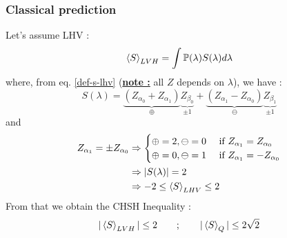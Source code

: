 \documentclass{article}
\begin{document}
\subsubsection*{Classical prediction}
Let's assume LHV :
\begin{equation}
    \braket{S}_{LVH} = \int \mathbb{P}(\lambda)S(\lambda) d\lambda
\end{equation}
where, from eq. \ref{def-s-lhv} (\underline{\textbf{note :}}  all $Z$ depends on
$\lambda$), we have :
\begin{equation}
    S(\lambda)
        = \underbrace{(Z_{\alpha_0}+Z_{\alpha_1})}_{\oplus}\underbrace{Z_{\beta_0}}_{\pm 1}
        + \underbrace{(Z_{\alpha_1}-Z_{\alpha_0})}_{\ominus}\underbrace{Z_{\beta_1}}_{\pm 1}
\end{equation}
and
\begin{equation}
    \begin{aligned}
        Z_{\alpha_1} = \pm Z_{\alpha_0}
            & \Rightarrow
                \begin{cases}
                    \oplus = 2, \ominus = 0 & \text{ if } Z_{\alpha_1} = Z_{\alpha_0} \\
                    \oplus = 0, \ominus = 1 & \text{ if } Z_{\alpha_1} = - Z_{\alpha_0} \\
                \end{cases} \\
            & \Rightarrow |S(\lambda)| = 2 \\
            & \Rightarrow -2 \leq \braket{S}_{LHV} \leq 2
    \end{aligned}
\end{equation}
From that we obtain the CHSH Inequality :
\begin{equation}
    |\braket{S}_{LVH}| \leq 2 \qquad ; \qquad |\braket{S}_Q| \leq 2\sqrt2
\end{equation}
\end{document}
